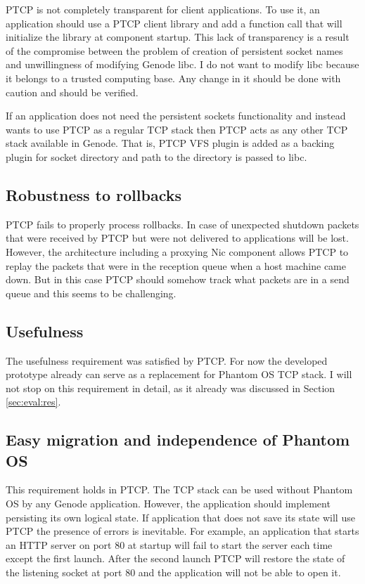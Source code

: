PTCP is not completely transparent for client applications. To use it, an
application should use a PTCP client library and add a function call that will
initialize the library at component startup. This lack of transparency is a
result of the compromise between the problem of creation of persistent socket
names and unwillingness of modifying Genode libc. I do not want to modify libc
because it belongs to a trusted computing base. Any change in it should be done
with caution and should be verified. 

If an application does not need the persistent sockets functionality and
instead wants to use PTCP as a regular TCP stack then PTCP acts as any other
TCP stack available in Genode. That is, PTCP VFS plugin is added as a backing
plugin for socket directory and path to the directory is passed to libc.

\subsection{Robustness to rollbacks}

PTCP fails to properly process rollbacks. In case of unexpected shutdown
packets that were received by PTCP but were not delivered to applications will
be lost. However, the architecture including a proxying Nic component allows
PTCP to replay the packets that were in the reception queue when a host machine
came down. But in this case PTCP should somehow track what packets are 
in a send queue and this seems to be challenging.

\subsection{Usefulness}

The usefulness requirement was satisfied by PTCP. For now the developed
prototype already can serve as a replacement for Phantom OS TCP stack. I will
not stop on this requirement in detail, as it already was discussed in
Section \ref{sec:eval:res}.

\subsection{Easy migration and independence of Phantom OS}

This requirement holds in PTCP. The TCP stack can be used without Phantom OS by
any Genode application. However, the application should implement persisting
its own logical state. If application that does not save its state will use
PTCP the presence of errors is inevitable. For example, an application that
starts an HTTP server on port 80 at startup will fail to start the server each
time except the first launch. After the second launch PTCP will restore the
state of the listening socket at port 80 and the application will not be able to
open it.

